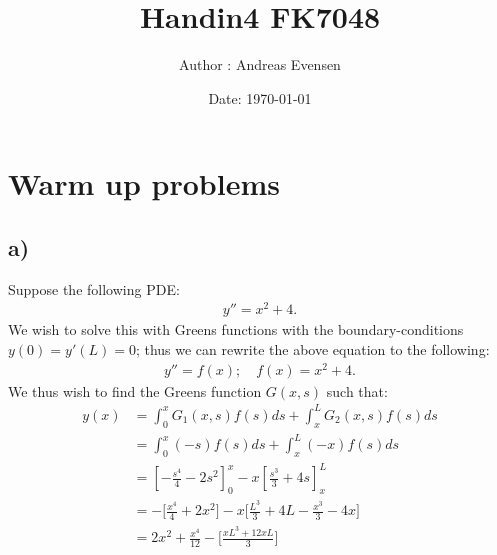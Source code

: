 \documentclass{article}
\title{Handin4 FK7048}
\author{Author : Andreas Evensen}
\date{Date: \today}
\begin{document}
\maketitle

\section*{Warm up problems}

\subsection*{a)}
Suppose the following PDE:
\begin{align*}
    y'' = x^2 + 4.
\end{align*}We wish to solve this with Greens functions with the boundary-conditions $y(0) = y'(L)=0$; thus we can rewrite the above equation to the following:
\begin{align*}
    y'' = f(x); \quad f(x) = x^2 + 4.
\end{align*}We thus wish to find the Greens function $G(x,s)$ such that:
\begin{align*}
    y(x) &= \int_0^x G_1(x,s)f(s)ds + \int_{x}^L G_2(x,s)f(s)ds\\
    &=\int_0^x (-s) f(s)ds + \int_{x}^L (-x)f(s)ds\\
    &= \left[-\frac{s^4}{4} - 2s^2\right]_0^x - x\left[\frac{s^3}{3} + 4s\right]_x^L\\
    &= -\Big[\frac{x^4}{4} + 2x^2\Big] - x\Big[\frac{L^3}{3} + 4L - \frac{x^3}{3} -4x\Big]\\
    &= 2x^2 + \frac{x^4}{12} - \Big[\frac{xL^3 + 12xL}{3}\Big]
\end{align*}
\end{document}
